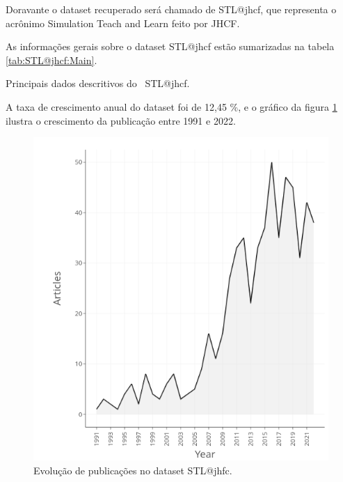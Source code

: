 Doravante o dataset recuperado será chamado de STL@jhcf, que representa o acrônimo Simulation Teach and Learn feito por JHCF.

As informações gerais sobre o dataset STL@jhcf estão sumarizadas na tabela \ref{tab:STL@jhcf:Main}.

\begin{table}[htp]
    \centering
{}
    \caption{Principais dados descritivos do \dataset\ STL@jhcf.}
    \label{tab:STL@jhcf:Main}
\end{table}

A taxa de crescimento anual do dataset foi de 12,45 \%, e o gráfico da figura \ref{STL@jhcf-Crescimento} ilustra o crescimento da publicação entre 1991 e 2022.

\begin{figure}
    \centering
    \includegraphics[width=\textwidth]{exploratory-data-analysis/jhcf/PesqBibliogr/SimulacaoSalaDeAula/STL@jhcf/figs/STL@jhcf-Annual-Scientific-Production.png}
    \caption{Evolução de publicações no dataset STL@jhfc.}
    \label{STL@jhcf-Crescimento}
\end{figure}